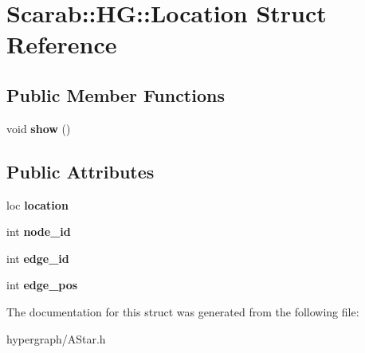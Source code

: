\hypertarget{structScarab_1_1HG_1_1Location}{
\section{Scarab::HG::Location Struct Reference}
\label{structScarab_1_1HG_1_1Location}
}
\subsection*{Public Member Functions}
\begin{DoxyCompactItemize}
\item 
\hypertarget{structScarab_1_1HG_1_1Location_a66e686eed3a0038886fd24171ec0ae8e}{
void {\bfseries show} ()}
\label{structScarab_1_1HG_1_1Location_a66e686eed3a0038886fd24171ec0ae8e}

\end{DoxyCompactItemize}
\subsection*{Public Attributes}
\begin{DoxyCompactItemize}
\item 
\hypertarget{structScarab_1_1HG_1_1Location_a493249f5c4c2ad6870d1cf1f9dd3f5f5}{
loc {\bfseries location}}
\label{structScarab_1_1HG_1_1Location_a493249f5c4c2ad6870d1cf1f9dd3f5f5}

\item 
\hypertarget{structScarab_1_1HG_1_1Location_a9a11d2d02ffd88048526a28c7619a3c7}{
int {\bfseries node\_\-id}}
\label{structScarab_1_1HG_1_1Location_a9a11d2d02ffd88048526a28c7619a3c7}

\item 
\hypertarget{structScarab_1_1HG_1_1Location_a618dd1682636ccc635ced4dc536be305}{
int {\bfseries edge\_\-id}}
\label{structScarab_1_1HG_1_1Location_a618dd1682636ccc635ced4dc536be305}

\item 
\hypertarget{structScarab_1_1HG_1_1Location_a9e3f8708a3b6c0271a7a854bc6dbde79}{
int {\bfseries edge\_\-pos}}
\label{structScarab_1_1HG_1_1Location_a9e3f8708a3b6c0271a7a854bc6dbde79}

\end{DoxyCompactItemize}


The documentation for this struct was generated from the following file:\begin{DoxyCompactItemize}
\item 
hypergraph/AStar.h\end{DoxyCompactItemize}
